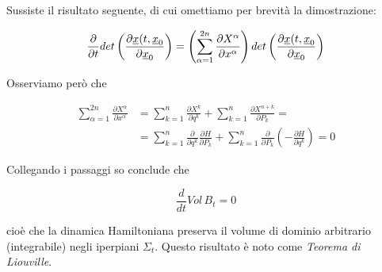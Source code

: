 Sussiste il risultato seguente, di cui omettiamo per brevità la dimostrazione:

\begin{equation*}
\frac{\partial }{\partial t} det \left( \frac{\partial \uline{x} (t, \uline{x}_0}{\partial \uline{x}_0} \right) = \left( \sum_{\alpha = 1}^{2n} \frac{\partial X^\alpha}{\partial x^\alpha} \right) det \left( \frac{\partial \uline{x} (t, \uline{x}_0}{\partial \uline{x}_0} \right)
\end{equation*}

Osserviamo però che

\begin{equation*}
\begin{split}
\sum_{\alpha = 1}^{2n} \frac{\partial X^\alpha}{\partial x^\alpha} & = \sum_{k = 1}^{n} \frac{\partial X^k}{\partial q^k} + \sum_{k = 1}^{n} \frac{\partial X^{n+k}}{\partial P_k} = \\
& = \sum_{k = 1}^{n} \frac{\partial}{\partial q^k} \frac{\partial H}{\partial P_k} + \sum_{k = 1}^{n} \frac{\partial}{\partial P_k} \left( -\frac{\partial H}{\partial q^k}  \right) = 0
\end{split}
\end{equation*}


Collegando i passaggi so conclude che

\begin{equation*}
\frac{d}{dt} Vol \, B_t = 0
\end{equation*}

cioè che la dinamica Hamiltoniana preserva il volume di dominio arbitrario (integrabile) negli iperpiani $ \Sigma_t $. Questo risultato è noto come \textit{Teorema di Liouville}.
